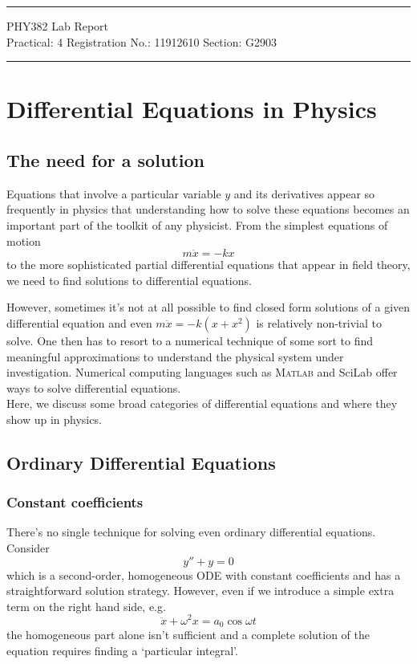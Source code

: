 \documentclass{article}
\begin{document}
	
	\author{Aayush Arya}
	\date{(Submitted: \today)}
	\title{}
	
	\maketitle
	
	\hrule
	\begin{center}
		PHY382 Lab Report\\
		Practical: 4 \quad Registration No.: 11912610 \quad Section: G2903
	\end{center}
	\hrule
	
	\tableofcontents
	
	\section{Differential Equations in Physics}
	\subsection{The need for a solution}
	Equations that involve a particular variable $y$ and its derivatives appear so frequently in physics that understanding how to solve these equations becomes an important part of the toolkit of any physicist. From the simplest equations of motion $$m\ddot{x} = -kx$$ to the more sophisticated partial differential equations that appear in field theory, we need to find solutions to differential equations.
	
	However, sometimes it's not at all possible to find closed form solutions of a given differential equation and even $m\ddot{x} = -k(x+x^2)$ is relatively non-trivial to solve. One then has to resort to a numerical technique of some sort to find meaningful approximations to understand the physical system under investigation. Numerical computing languages such as \textsc{Matlab} and SciLab offer ways to solve differential equations.\\

	Here, we discuss some broad categories of differential equations and where they show up in physics.
	
	\subsection{Ordinary Differential Equations}
	
	\subsubsection{Constant coefficients}
	There's no single technique for solving even ordinary differential equations. Consider $$ y'' +y = 0 $$
	which is a second-order, homogeneous ODE with constant coefficients and has a straightforward solution strategy. However, even if we introduce a simple extra term on the right hand side, e.g. $$ \ddot{x} + \omega^2 x = a_0 \cos\omega t$$ the homogeneous part alone isn't sufficient and a complete solution of the equation requires finding a `particular integral'.
	
\end{document}
